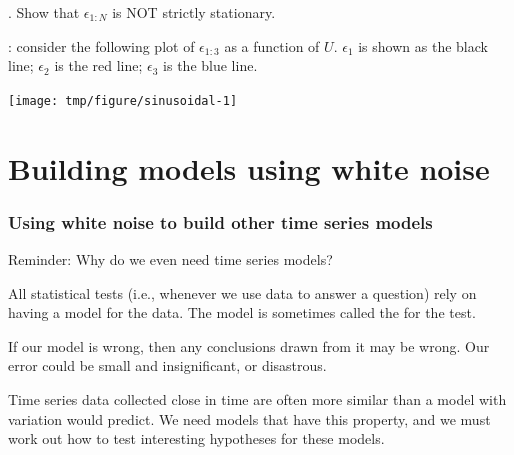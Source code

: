 \begin{frame}[fragile]

{\myquestion}. Show that $\epsilon_{1:N}$ is NOT strictly stationary.

\vspace{1mm}
: consider the following plot of $\epsilon_{1:3}$ as a function of $U$.
$\epsilon_1$ is shown as the black line; $\epsilon_2$ is the red line; $\epsilon_3$ is the blue line.


\begin{knitrout}\small
{}\color{fgcolor}

{\centering \texttt{[image: tmp/figure/sinusoidal-1]} 

}


\end{knitrout}


\end{frame}


\section{Building models using white noise}

\begin{frame}[fragile]

\frametitle{Using white noise to build other time series models}

Reminder: Why do we even need time series models?

\bi
\item All statistical tests (i.e., whenever we use data to answer a question) rely on having a model for the data. The model is sometimes called the  for the test.

\item If our model is wrong, then any conclusions drawn from it may be wrong. Our error could be small and insignificant, or disastrous.
 
\item Time series data collected close in time are often more similar than a model with {\iid} variation would predict. We need models that have this property, and we must work out how to test interesting hypotheses for these models.

\ei

\end{frame} 

